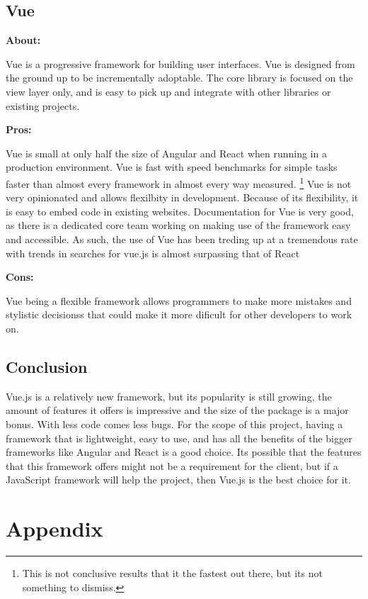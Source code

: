 \documentclass[draftclsnofoot,onecolumn,letterpaper,10pt,compsoc]{IEEEtran}
\begin{document}
  \subsection{Vue}

    \textbf{About:}

    Vue is a progressive framework for building user interfaces.
    Vue is designed from the ground up to be incrementally adoptable.
    The core library is focused on the view layer only, and is easy to pick up and integrate with other libraries or existing projects.


    \textbf{Pros:}

    Vue is small at only half the size of Angular and React when running in a production environment.
    Vue is fast with speed benchmarks for simple tasks faster than almost every framework in almost every way measured.
    \footnote{This is not conclusive results that it the fastest out there, but its not something to dismiss.\cite{SpeedReport}}
    Vue is not very opinionated and allows flexilbity in development.\cite{Vue}
    Because of its flexibility, it is easy to embed code in existing websites.
    Documentation for Vue is very good, as there is a dedicated core team working on making use of the framework easy and accessible.
    As such, the use of Vue has been treding up at a tremendous rate with trends in searches for vue.js is almost surpassing that of React\cite{vueVSreactSearches}

    \textbf{Cons:}

    Vue being a flexible framework allows programmers to make more mistakes and stylistic decisionss that could make it more dificult for other developers to work on.


  \subsection{Conclusion}
    Vue.js is a relatively new framework, but its popularity is still growing, the amount of features it offers is impressive and the size of the package is a major bonus.
    With less code comes less bugs.
    For the scope of this project, having a framework that is lightweight, easy to use, and has all the benefits of the bigger frameworks like Angular and React is a good choice.
    Its possible that the features that this framework offers might not be a requirement for the client, but if a JavaScript framework will help the project, then Vue.js is the best choice for it.

\section{Appendix}
\end{document}
